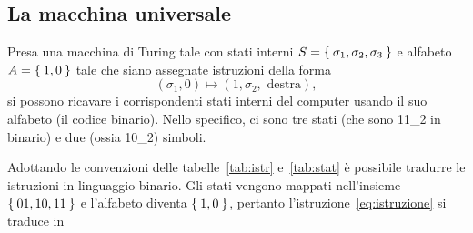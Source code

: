		\subsection{La macchina universale}
Presa una macchina di Turing tale con stati interni $S=\Set{\sigma_1, \sigma_2, \sigma_3}$ e alfabeto $A=\Set{1, 0}$ tale che siano assegnate istruzioni della forma
\begin{equation}\label{eq:istruzione}
(\sigma_1, 0) \mapsto (1, \sigma_2, \text{ destra}),	%
\end{equation}
si possono ricavare i corrispondenti stati interni del computer usando il suo alfabeto (il codice binario).
Nello specifico, ci sono tre stati  (che sono \num[parse-numbers=false]{11_2} in binario) e due (ossia \num[parse-numbers=false]{10_2}) simboli.
\begin{table}
	\centering
{}\qquad
\subfloat[][{Stati interni.}\label{tab:stat}]{%
	\begin{tabular}{l S[parse-numbers=false]}
		\toprule
\emph{Stato}			&{\emph{Numero}}	\\
		\midrule
$\sigma_1$				&01	\\
$\sigma_2$				&10	\\
$\sigma_3$				&11	\\
		\bottomrule
	\end{tabular}
}
	\caption[Macchina di Turing]{Convenzioni binarie per la macchina di Turing.}
\end{table}
Adottando le convenzioni delle tabelle~\ref{tab:istr} e~\ref{tab:stat} è possibile tradurre le istruzioni in linguaggio binario.
Gli stati vengono mappati nell'insieme $\Set{01,10,11}$ e l'alfabeto diventa $\Set{1,0}$, pertanto l'istruzione~\eqref{eq:istruzione} si traduce in
